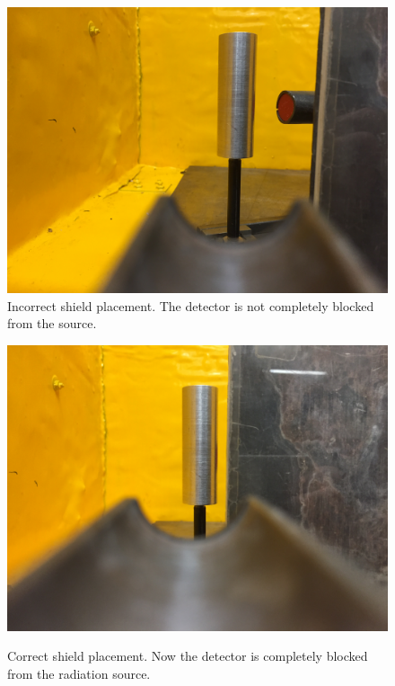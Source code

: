 \documentclass{../lab}
\begin{document}
\begin{enumerate}
\begin{figure}[H]
\begin{minipage}{.49\linewidth}
    \centering
    \href{http://experimentationlab.berkeley.edu/sites/default/files/upimages/Detector-Exposed.JPG}{\includegraphics[width=\linewidth,keepaspectratio]{images/Detector-Exposed.JPG}} \\
    \caption{Incorrect shield placement. The detector is not completely blocked from the source.}
    \label{fig:IncorrectShield}
\end{minipage}\hfill
\begin{minipage}{.49\linewidth}
    \centering
    \href{http://experimentationlab.berkeley.edu/sites/default/files/upimages/Detector-Shielded.JPG}{\includegraphics[width=\linewidth,keepaspectratio]{images/Detector-Shielded.JPG}} \\
    \caption{Correct shield placement. Now the detector is completely blocked from the radiation source.}
    \label{fig:CorrectShield}
\end{minipage} 
\end{figure}  


\end{enumerate}
\end{document}
